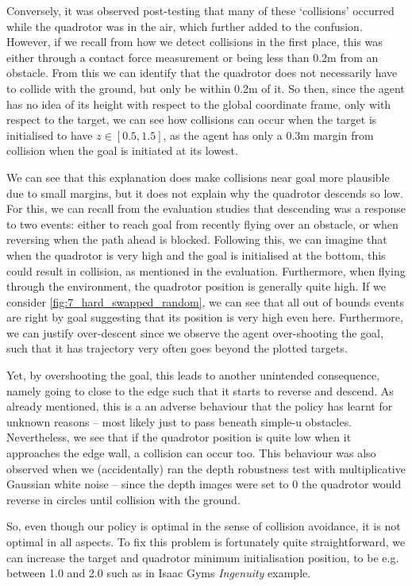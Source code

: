 Conversely, it was observed post-testing that many of these `collisions' occurred while the quadrotor was in the air, which further added to the confusion. However, if we recall from how we detect collisions in the first place, this was either through a contact force measurement or being less than 0.2m from an obstacle. From this we can identify that the quadrotor does not necessarily have to collide with the ground, but only be within 0.2m of it. So then, since the agent has no idea of its height with respect to the global coordinate frame, only with respect to the target, we can see how collisions can occur when the target is initialised to have $z \in [0.5, 1.5]$, as the agent has only a 0.3m margin from collision when the goal is initiated at its lowest.

We can see that this explanation does make collisions near goal more plausible due to small margins, but it does not explain why the quadrotor descends so low. For this, we can recall from the evaluation studies that descending was a response to two events: either to reach goal from recently flying over an obstacle, or when reversing when the path ahead is blocked. Following this, we can imagine that when the quadrotor is very high and the goal is initialised at the bottom, this could result in collision, as mentioned in the evaluation. Furthermore, when flying through the environment, the quadrotor position is generally quite high. If we consider \cref{fig:7_hard_swapped_random}, we can see that all out of bounds events are right by goal suggesting that its position is very high even here. Furthermore, we can justify over-descent since we observe the agent over-shooting the goal, such that it has trajectory very often goes beyond the plotted targets.

Yet, by overshooting the goal, this leads to another unintended consequence, namely going to close to the edge such that it starts to reverse and descend. As already mentioned, this is a an adverse behaviour that the policy has learnt for unknown reasons -- most likely just to pass beneath simple-u obstacles. Nevertheless, we see that if the quadrotor position is quite low when it approaches the edge wall, a collision can occur too. This behaviour was also observed when we (accidentally) ran the depth robustness test with multiplicative Gaussian white noise -- since the depth images were set to 0 the quadrotor would reverse in circles until collision with the ground.

So, even though our policy is optimal in the sense of collision avoidance, it is not optimal in all aspects. To fix this problem is fortunately quite straightforward, we can increase the target and quadrotor minimum initialisation position, to be e.g. between 1.0 and 2.0 such as in Isaac Gyms \textit{Ingenuity} example.


